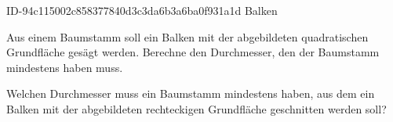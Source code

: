 \begin{exercise}
      {ID-94c115002c858377840d3c3da6b3a6ba0f931a1d}
      {Balken}
  \ifproblem\problem
    \begin{minipage}[c]{0.20\linewidth}
      \centering
    \end{minipage}\hfill
    \begin{minipage}[c]{0.79\linewidth}
    Aus einem Baumstamm soll ein Balken mit der abgebildeten quadratischen
    Grundfläche gesägt werden. Berechne den Durchmesser, den der Baumstamm
    mindestens haben muss.
    \end{minipage}\par
    \begin{minipage}[c]{0.20\linewidth}
      \centering
    \end{minipage}\hfill
    \begin{minipage}[c]{0.79\linewidth}
    Welchen Durchmesser muss ein Baumstamm mindestens haben, aus dem
    ein Balken mit der abgebildeten rechteckigen Grundfläche geschnitten
    werden soll?
    \end{minipage}
  \fi
\end{exercise}
